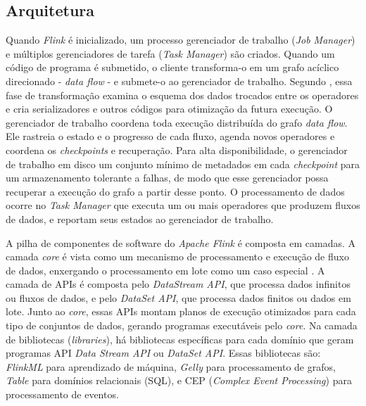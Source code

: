 \subsection{Arquitetura}

\newcommand{\jobmngr}{\xspace{}gerenciador de trabalho\xspace}
\newcommand{\taskmngr}{\xspace{}gerenciador de tarefa\xspace}

Quando \emph{Flink} é inicializado, um processo \jobmngr
(\emph{Job Manager}) e múltiplos gerenciadores de tarefa (\emph{Task Manager}) são criados.
Quando um código de programa é submetido, o cliente transforma-o em um grafo
acíclico direcionado - \emph{data flow} - e submete-o ao \jobmngr.
Segundo , essa fase de transformação examina o esquema
dos dados trocados entre os operadores e cria serializadores e
outros códigos para otimização da futura execução.
O \jobmngr coordena toda execução distribuída do grafo \emph{data
flow}. Ele rastreia o estado e o progresso de cada fluxo, agenda novos
operadores e coordena os \emph{checkpoints} e recuperação.
Para alta disponibilidade, o \jobmngr {} em disco um conjunto mínimo de
metadados em cada \emph{checkpoint} para um armazenamento tolerante a falhas, de
modo que esse gerenciador possa recuperar a execução do grafo a partir desse
ponto.
O processamento de dados ocorre no \emph{Task Manager} que executa um ou mais
operadores que produzem fluxos de dados, e reportam seus estados ao \jobmngr.


A pilha de componentes de software do \emph{Apache Flink} é composta em camadas.
A camada \emph{core} é vista como um mecanismo de processamento e execução de
fluxo de dados, enxergando o processamento em lote como um caso especial
\cite{Lopez2018,Carbone2015}.
A camada de APIs é composta pelo \emph{DataStream API}, que processa dados
infinitos ou fluxos de dados, e pelo \emph{DataSet API}, que processa dados
finitos ou dados em lote.
Junto ao \emph{core}, essas APIs montam planos de execução otimizados para cada
tipo de conjuntos de dados, gerando programas executáveis pelo \emph{core}.
Na camada de bibliotecas (\emph{libraries}), há bibliotecas específicas para
cada domínio que geram programas API \emph{Data Stream API} ou \emph{DataSet
API}.
Essas bibliotecas são: \emph{FlinkML} para aprendizado de máquina, \emph{Gelly}
para processamento de grafos, \emph{Table} para domínios relacionais (SQL), e
CEP (\emph{Complex Event Processing}) para processamento de eventos.

